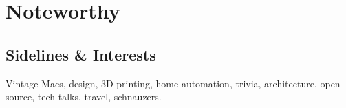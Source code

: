 \documentclass[]{cvpn}
\begin{document}
\begin{multicols}{2}
\begin{eventlist}
\end{eventlist}

\section{Noteworthy}




\subsection{Sidelines \& Interests}
Vintage Macs, design, 3D printing, home automation,
trivia, architecture, open source, tech talks, travel, schnauzers.


\end{multicols}
\end{document}
